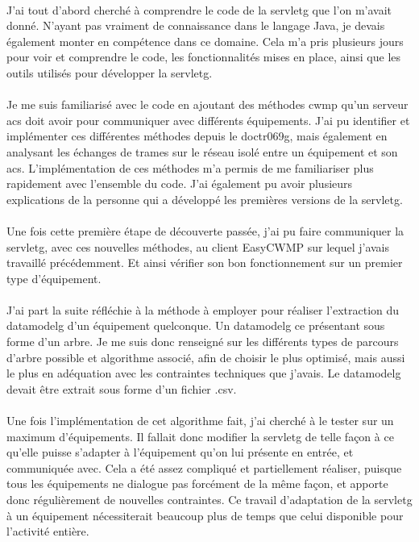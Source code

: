 \documentclass[12pt,a4paper]{report}
\begin{document}
\paragraph*{}J’ai tout d’abord cherché à comprendre le code de la \gls{servletg} que l’on m’avait donné. N’ayant pas vraiment de connaissance dans le langage Java, je devais également monter en compétence dans ce domaine. Cela m’a pris plusieurs jours pour voir et comprendre le code, les fonctionnalités mises en place, ainsi que les outils utilisés pour développer la \gls{servletg}.
\paragraph*{}Je me suis familiarisé avec le code en ajoutant des méthodes \gls{cwmp} qu’un serveur \gls{acs} doit avoir pour communiquer avec différents équipements. J’ai pu identifier et implémenter ces différentes méthodes depuis le \gls{doctr069g}, mais également en analysant les échanges de trames sur le réseau isolé entre un équipement et son \gls{acs}. L’implémentation de ces méthodes m’a permis de me familiariser plus rapidement avec l’ensemble du code. J’ai également pu avoir plusieurs explications de la personne qui a développé les premières versions de la \gls{servletg}.
\paragraph*{}Une fois cette première étape de découverte passée, j’ai pu faire communiquer la \gls{servletg}, avec ces nouvelles méthodes, au client EasyCWMP sur lequel j’avais travaillé précédemment. Et ainsi vérifier son bon fonctionnement sur un premier type d’équipement.
\paragraph*{}J’ai part la suite réfléchie à la méthode à employer pour réaliser l’extraction du \gls{datamodelg} d’un équipement quelconque. Un \gls{datamodelg} ce présentant sous forme d’un arbre. Je me suis donc renseigné sur les différents types de parcours d’arbre possible et algorithme associé, afin de choisir le plus optimisé, mais aussi le plus en adéquation avec les contraintes techniques que j’avais. Le \gls{datamodelg} devait être extrait sous forme d’un fichier .csv.
\paragraph*{} Une fois l’implémentation de cet algorithme fait, j’ai cherché à le tester sur un maximum d’équipements. Il fallait donc modifier la \gls{servletg} de telle façon à ce qu’elle puisse s’adapter à l’équipement qu’on lui présente en entrée, et communiquée avec. Cela a été assez compliqué et partiellement réaliser, puisque tous les équipements ne dialogue pas forcément de la même façon, et apporte donc régulièrement de nouvelles contraintes. Ce travail d’adaptation de la \gls{servletg} à un équipement nécessiterait beaucoup plus de temps que celui disponible pour l’activité entière.
\end{document}
